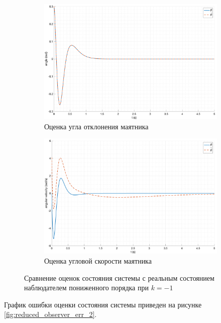 \begin{figure}[ht!]
\begin{subfigure}[b]{0.45\textwidth}
        \includegraphics[width=\textwidth]{media/plots/reduced_observer/reduced_observer_theta_cmp_2.png}
        \caption{Оценка угла отклонения маятника}
        \label{fig:reduced_observer_theta_cmp_2}
    \end{subfigure}
    \begin{subfigure}[b]{0.45\textwidth}
        \includegraphics[width=\textwidth]{media/plots/reduced_observer/reduced_observer_dottheta_cmp_2.png}
        \caption{Оценка угловой скорости маятника}
        \label{fig:reduced_observer_dottheta_cmp_2}
    \end{subfigure}
    \caption{Сравнение оценок состояния системы с реальным состоянием наблюдателем пониженного порядка при $k = -1$}
    \label{fig:reduced_observer_x_cmp_2_sep}
\end{figure}
График ошибки оценки состояния системы приведен на рисунке \ref{fig:reduced_observer_err_2}.
